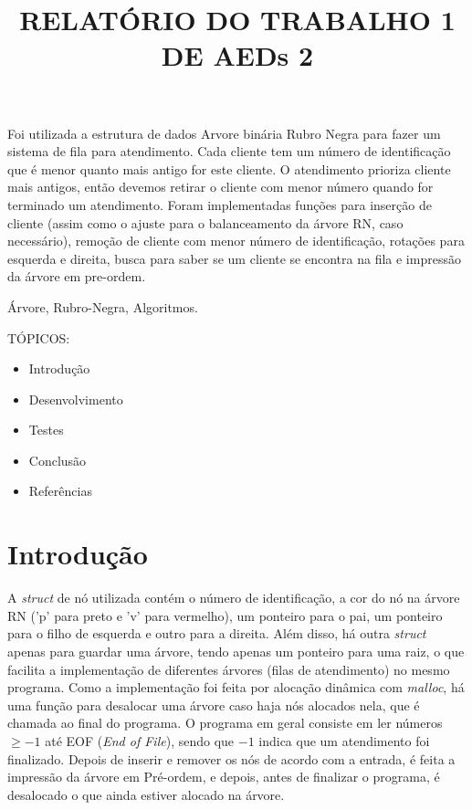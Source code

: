 \documentclass[a4paper,11pt]{article}
\begin{document}
\title{RELATÓRIO DO TRABALHO 1 DE AEDs 2}

\maketitle
\thispagestyle{fancy}

\author{
}

\author{
}

\vspace{8mm}
\begin{resumo}
Foi utilizada a estrutura de dados Arvore binária Rubro Negra para fazer um sistema de fila para atendimento. Cada cliente tem um número de identificação que é menor quanto mais antigo for este cliente. O atendimento prioriza cliente mais antigos, então devemos retirar o cliente com menor número quando for terminado um atendimento. Foram implementadas funções para inserção de cliente (assim como o ajuste para o balanceamento da árvore RN, caso necessário), remoção de cliente com menor número de identificação, rotações para esquerda e direita, busca para saber se um cliente se encontra na fila e impressão da árvore em pre-ordem.
 \end{resumo}

\bigskip
\begin{palchaves}
Árvore, Rubro-Negra, Algoritmos.

\bigskip
TÓPICOS:
\medskip
\end{palchaves}
\begin{itemize}
    \item Introdução
    \item Desenvolvimento
    \item Testes
    \item Conclusão
    \item Referências
\end{itemize}

\newpage
\section{Introdução}

    A \textit{struct} de nó utilizada contém o número de identificação, a cor do nó na árvore RN ('p' para preto e 'v' para vermelho), um ponteiro para o pai, um ponteiro para o filho de esquerda e outro para a direita. Além disso, há outra \textit{struct} apenas para guardar uma árvore, tendo apenas um ponteiro para uma raiz, o que facilita a implementação de diferentes árvores (filas de atendimento) no mesmo programa. Como a implementação foi feita por alocação dinâmica com \textit{malloc}, há uma função para desalocar uma árvore caso haja nós alocados nela, que é chamada ao final do programa. O programa em geral consiste em ler números $\geq -1$ até EOF (\textit{End of File}), sendo que $-1$ indica que um atendimento foi finalizado. Depois de inserir e remover os nós de acordo com a entrada, é feita a impressão da árvore em Pré-ordem, e depois, antes de finalizar o programa, é desalocado o que ainda estiver alocado na árvore.
\bigskip
\end{document}
